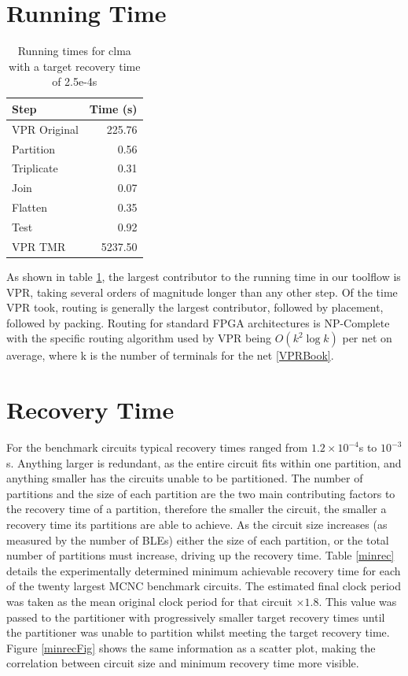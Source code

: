 \documentclass[12pt,final,oneside]{dwThesis} %
\begin{document}
   \section{Running Time}\label{timing}
   
   \begin{table}
      \begin{center}
   \begin{tabular}{lr}
	\toprule
   	Step & Time (s) \\
   	\midrule
   	VPR Original & 225.76\\
   	Partition & 0.56 \\
   	Triplicate & 0.31 \\
   	Join & 0.07 \\
   	Flatten & 0.35 \\
   	Test & 0.92 \\
   	VPR TMR & 5237.50\\
   	\bottomrule
   \end{tabular}
   \caption{Running times for clma with a target recovery time of 2.5e-4s}\label{runningtimes}
   \end{center}\end{table}
   As shown in table \ref{runningtimes}, the largest contributor to the running time in our toolflow is \gls{VPR}, taking several orders of magnitude longer than any other step. Of the time \gls{VPR} took, routing is generally the largest contributor, followed by placement, followed by packing.
   Routing for standard \gls{FPGA} architectures is NP-Complete \cite{npcomplete} with the specific routing algorithm used by \gls{VPR} being $O(k^2\log{k})$ per net on average,
   where k is the number of terminals for the net \ref{VPRBook}.
   


   \section{Recovery Time}
    For the benchmark circuits typical recovery times ranged from $1.2\times10^{-4}$s to $10^{-3}$s. Anything larger is redundant, as the entire circuit fits within one partition, and anything smaller has the circuits unable to be partitioned. The number of partitions and the size of each partition are the two main contributing factors to the recovery time of a partition, therefore the smaller the circuit, the smaller a recovery time its partitions are able to achieve. As the circuit size increases (as measured by the number of \glspl{BLE}) either the size of each partition, or the total number of partitions must increase, driving up the recovery time.
    Table \ref{minrec} details the experimentally determined minimum achievable recovery time for each of the twenty largest \gls{MCNC} benchmark circuits. The estimated final clock period was taken as the mean original clock period for that circuit $\times 1.8$. This value was passed to the partitioner with progressively smaller target recovery times until the partitioner was unable to partition whilst meeting the target recovery time.
    Figure \ref{minrecFig} shows the same information as a scatter plot, making the correlation between circuit size and minimum recovery time more visible.
    
\end{document}
